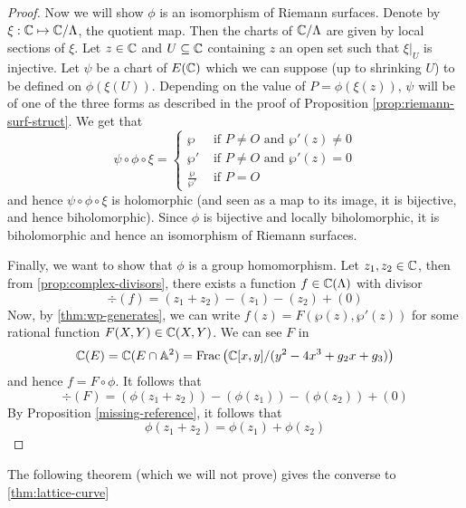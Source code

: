\begin{proof}
	Now we will show $\phi$ is an isomorphism of Riemann surfaces.
	Denote by $\xi: \mathbb{C} \mapsto \mathbb{C}/\Lambda$, the quotient map.
	Then the charts of $\mathbb{C}/\Lambda$ are given by local sections of $\xi$.
	Let $z \in \mathbb{C}$ and $U \subseteq \mathbb{C}$ containing $z$ an open set such that 
	$\xi\vert_U$ is injective. Let $\psi$ be a chart of $E(\mathbb{C})$
	which we can suppose (up to shrinking $U$) to be defined on
	$\phi(\xi(U))$.
	Depending on the value of $P = \phi(\xi(z))$, $\psi$ will be of one of the
	three forms as described in the proof of 
	Proposition \ref{prop:riemann-surf-struct}.
	We get that
	\begin{equation*}
		\psi\circ\phi\circ\xi = 
		\begin{cases}
			\wp &\textrm{ if } P \neq O\textrm{ and }\wp'(z) \neq 0\\
			\wp' &\textrm{ if } P \neq O\textrm{ and }\wp'(z) = 0\\
			\frac{\wp}{\wp'} &\textrm{ if }P = O
		\end{cases}
	\end{equation*}
	and hence $\psi\circ\phi\circ\xi$ is holomorphic (and seen as a map to its
	image, it is bijective, and hence biholomorphic). Since $\phi$ is
	bijective and locally biholomorphic, it is
	biholomorphic and hence an isomorphism of Riemann surfaces.
	
	Finally, we want to show that $\phi$ is a group homomorphism.
	Let $z_1, z_2 \in \mathbb{C}$, then from \ref{prop:complex-divisors}, there exists
	a function $f \in \mathbb{C}(\Lambda)$ with divisor
	\begin{equation*}
		\div(f) = (z_1 + z_2) - (z_1) - (z_2) + (0)
	\end{equation*}
	Now, by \ref{thm:wp-generates}, we can write $f(z) = F(\wp(z), \wp'(z))$ for
	some rational function $F(X, Y) \in \mathbb{C}(X, Y)$. We can see $F$ in
	\begin{equation*}
		\mathbb{C}(E) = \mathbb{C}(E\cap \mathbb{A}^2) = \operatorname{Frac}\left(\mathbb{C}[x, y]/(y^2 - 4x^3 + g_2x + g_3)\right)	
	\end{equation*}
	and hence $f = F \circ \phi$. It follows that
	\begin{equation*}
		\div (F) = (\phi(z_1 + z_2)) - (\phi(z_1)) - (\phi(z_2)) + (0)
	\end{equation*}
	By Proposition \ref{missing-reference}, it follows that
	\begin{equation*}
		\phi(z_1 + z_2) = \phi(z_1) + \phi(z_2)
	\end{equation*}
\end{proof}

The following theorem (which we will not prove) gives the converse to \ref{thm:lattice-curve}

